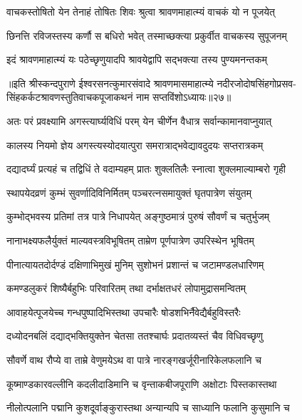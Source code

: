 \twolineshloka
{वाचकस्तोषितो येन तेनाहं तोषितः शिवः}
{श्रुत्वा श्रावणमाहात्म्यं वाचकं यो न पूजयेत्} %

\twolineshloka
{छिनत्ति रविजस्तस्य कर्णौ स बधिरो भवेत्}
{तस्माच्छक्त्या प्रकुर्वीत वाचकस्य सुपूजनम्} %

\twolineshloka
{इदं श्रावणमाहात्म्यं यः पठेच्छृणुयादपि}
{श्रावयेद्वापि सद्भक्त्या तस्य पुण्यमनन्तकम्} %


{॥इति श्रीस्कन्दपुराणे ईश्वरसनत्कुमारसंवादे श्रावणमासमाहात्म्ये नदीरजोदोषसिंहगोप्रसव-सिंहकर्कटश्रावणस्तुतिवाचकपूजाकथनं नाम सप्तविंशोऽध्यायः॥२७॥}





\twolineshloka
{अतः परं प्रवक्ष्यामि अगस्त्यार्घ्यविधिं परम्}
{येन चीर्णेन वैधात्र सर्वान्कामानवाप्नुयात्} %

\twolineshloka
{कालस्य नियमो ज्ञेय अगस्त्यस्योदयात्पुरा}
{समरात्राद्भवेद्यावदुदयः सप्तरात्रकम्} %

\twolineshloka
{दद्यादर्घ्यं प्रत्यहं च तद्विधिं ते वदाम्यहम्}
{प्रातः शुक्लतिलैः स्नात्वा शुक्लमाल्याम्बरो गृही} %

\twolineshloka
{स्थापयेदव्रणं कुम्भं सुवर्णादिविनिर्मितम्}
{पञ्चरत्नसमायुक्तं घृतपात्रेण संयुतम्} %

\twolineshloka
{कुम्भोद्भवस्य प्रतिमां तत्र पात्रे निधापयेत्}
{अङ्गुष्ठमात्रं पुरुषं सौवर्णं च चतुर्भुजम्} %

\twolineshloka
{नानाभक्ष्यफलैर्युक्तं माल्यवस्त्रविभूषितम्}
{ताम्रेण पूर्णपात्रेण उपरिस्थेन भूषितम्} %

\twolineshloka
{पीनात्यायतदोर्दण्डं दक्षिणाभिमुखं मुनिम्}
{सुशोभनं प्रशान्तं च जटामण्डलधारिणम्} %

\twolineshloka
{कमण्डलुकरं शिष्यैर्बहुभिः परिवारितम्}
{तथा दर्भाक्षतधरं लोपामुद्रासमन्वितम्} %

\twolineshloka
{आवाहयेत्पूजयेच्च गन्धपुष्पादिभिस्तथा}
{उपचारैः षोडशभिर्नैवेद्यैर्बहुविस्तरैः} %

\twolineshloka
{दध्योदनबलिं दद्याद्भक्तियुक्तेन चेतसा}
{ततश्चार्घः प्रदातव्यस्तं चैव विधिवच्छृणु} %

\twolineshloka
{सौवर्णे वाथ रौप्ये वा ताम्रे वेणुमयेऽथ वा}
{पात्रे नारङ्गखर्जूरीनारिकेलफलानि च} %

\twolineshloka
{कूष्माण्डकारवल्लीनि कदलीदाडिमानि च}
{वृन्ताकबीजपूराणि अक्षोटाः पिस्तकास्तथा} %

\twolineshloka
{नीलोत्पलानि पद्मानि कुशदूर्वाङ्कुरास्तथा}
{अन्यान्यपि च साध्यानि फलानि कुसुमानि च} %

